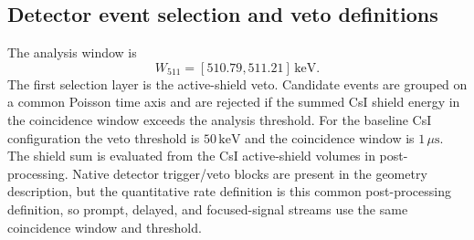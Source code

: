 \documentclass[pdflatex,sn-mathphys-num]{sn-jnl}
\newcommand{\keV}{\,\mathrm{keV}}
\newcommand{\wii}{W_{511}}
\begin{document}
\subsection{Detector event selection and veto definitions}
\label{sec:selection}

The analysis window is
\begin{equation}
  \wii = [510.79,511.21]\keV .
\end{equation}
The first selection layer is the active-shield veto. Candidate events are
grouped on a common Poisson time axis and are rejected if the summed CsI shield
energy in the coincidence window exceeds the analysis threshold. For the
baseline CsI configuration the veto threshold is $50\keV$ and the coincidence
window is $1\,\mu\mathrm{s}$. The shield sum is evaluated from the CsI
active-shield volumes in post-processing. Native detector trigger/veto blocks
are present in the geometry description, but the quantitative rate definition is
this common post-processing definition, so prompt, delayed, and focused-signal
streams use the same coincidence window and threshold.
\end{document}
